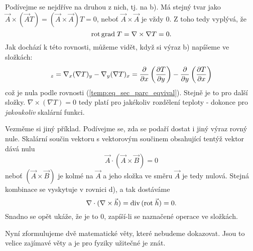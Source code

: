     Podívejme se nejdříve na druhou z nich, tj. na b). Má stejný tvar jako $\vec{A}\times(\vec{A}T)= 
    (\vec{A}\times\vec{A})T = 0$, neboť $\vec{A}\times\vec{A}$ je 
    vždy \(0\). Z toho tedy vyplývá, že
    \begin{equation}\label{FYZ:eq_rotgrad}
      \mathrm{rot}\,\mathrm{grad\;}T = \nabla\times\nabla T = 0.
    \end{equation}
    Jak dochází k této rovnosti, můžeme vidět, když si výraz b) napíšeme ve složkách: 
    \begin{equation*}
      [\nabla\times(\nabla T)]_z = \nabla_x(\nabla T)_y-\nabla_y(\nabla T)_x =
       \pder{}{x}\left(\pder{T}{y}\right) - \pder{}{y}\left(\pder{T}{x}\right)
    \end{equation*}
    což je nula podle rovnosti (\ref{temp:eq_sec_parc_eqvival}). Stejně je to pro další složky.
    \(\nabla\times(\nabla T)=0\) tedy platí pro jakékoliv rozdělení teploty - dokonce pro \emph{jakoukoliv} 
    skalární funkci.
  
    Vezměme si jiný příklad. Podívejme se, zda se podaří dostat i jiný výraz rovný nule. Skalární součin 
    vektoru s vektorovým součinem obsahující tentýž vektor dává nulu
    \begin{equation*}
      \vec{A}\cdot(\vec{A}\times\vec{B}) = 0
    \end{equation*}
    neboť \((\vec{A}\times\vec{B})\) je kolmé na \(\vec{A}\) a jeho složka ve směru \(\vec{A}\) je tedy 
    nulová. Stejná kombinace se vyskytuje v rovnici d), a tak dostáváme
    \begin{equation}\label{FYZ:eq_divrot}
      \nabla\cdot(\nabla\times\vec{h}) = \mathrm{div}\,(\mathrm{rot}\;\vec{h})= 0.
    \end{equation}
    Snadno se opět ukáže, že je to \(0\), zapíší-li se naznačené operace ve složkách.
  
    Nyní zformulujeme dvě matematické věty, které nebudeme dokazovat. Jsou to velice zajímavé věty a je pro 
    fyziky užitečné je znát. 
  
